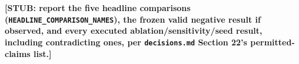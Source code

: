 %

\textbf{[STUB: report the five headline comparisons
(\texttt{HEADLINE\_COMPARISON\_NAMES}), the frozen valid negative result
if observed, and every executed ablation/sensitivity/seed result,
including contradicting ones, per \texttt{decisions.md} Section 22's
permitted-claims list.]}

